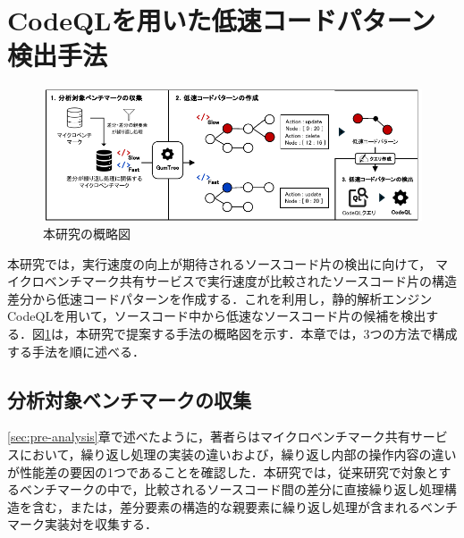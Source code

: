 \documentclass[submit,techrep,noauthor]{ipsj}
\newcommand{\memo}[1]{\colorbox{magenta!30}{{\bf MEMO}:}{\color{red!50} {\textbf{[#1]}}}}
\begin{document}
\section{CodeQLを用いた低速コードパターン検出手法}
\label{sec:approach}

\begin{figure}[t]
    \centering
    \includegraphics[width=0.9\linewidth]{./Noguchi_fig/approach_abst.pdf}
    \caption{本研究の概略図}
    \label{fig:Approach}
\end{figure}

本研究では，実行速度の向上が期待されるソースコード片の検出に向けて，
マイクロベンチマーク共有サービスで実行速度が比較されたソースコード片の構造差分から低速コードパターンを作成する．これを利用し，静的解析エンジンCodeQLを用いて，ソースコード中から低速なソースコード片の候補を検出する．図\ref{fig:Approach}は，本研究で提案する手法の概略図を示す．本章では，3つの方法で構成する手法を順に述べる．


\subsection{分析対象ベンチマークの収集}

\ref{sec:pre-analysis}章で述べたように，著者らはマイクロベンチマーク共有サービスにおいて，繰り返し処理の実装の違いおよび，繰り返し内部の操作内容の違いが性能差の要因の1つであることを確認した．本研究では，従来研究\cite{omori}で対象とするベンチマークの中で，比較されるソースコード間の差分に直接繰り返し処理構造を含む，または，差分要素の構造的な親要素に繰り返し処理が含まれるベンチマーク実装対を収集する．
\end{document}
